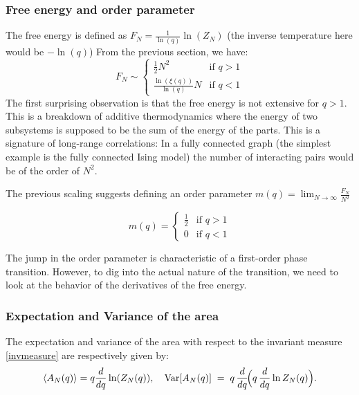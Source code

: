 \documentclass[pdflatex,sn-mathphys-num]{sn-jnl}
\theoremstyle{definition}
\theoremstyle{remark}
\numberwithin{equation}{section}
\begin{document}
\subsubsection{Free energy and order parameter}
The free energy is defined as $F_N = \frac{1}{\ln(q)} \ln(Z_N)$ (the inverse temperature here would be $-\ln(q)$)
From the previous section, we have:
\begin{equation}
    F_N \sim 
        \begin{cases}
      \frac{1}{2} N^2 & \text{if } q > 1\\
       \frac{ \ln(\xi(q))}{\ln(q)} N & \text{if } q < 1
    \end{cases}
\end{equation}
The first surprising observation is that the free energy is not extensive for $q>1$. This is a breakdown of additive thermodynamics where the energy of two subsystems is supposed to be the sum of the energy of the parts. This is a signature of long-range correlations: In a fully connected graph (the simplest example is the fully connected Ising model) the number of interacting pairs would be of the order of $N^2$.

The previous scaling suggests defining
an order parameter $ m(q) = \lim_{N \rightarrow \infty}
    \frac{F_N}{N^2}$


\begin{equation}
m(q) =
        \begin{cases}
       \frac{1}{2}  & \text{if } q > 1\\
        0 & \text{if } q < 1
    \end{cases}
\end{equation}

The jump in the order parameter is characteristic of a first-order phase transition. However, to dig into the actual nature of the transition, we need to look at the behavior of the derivatives of the free energy.
\subsubsection{Expectation and Variance of the area}
The expectation and variance of the area with respect to the invariant measure \ref{invmeasure} are respectively given by:
\begin{equation}
\langle A_N(q) \rangle  = q \frac{d}{dq} \ln(Z_N(q)), \quad
\operatorname{Var}[A_N(q)]
   \;=\;
   q\,\frac{d}{dq}\!\Bigl(q\,\frac{d}{dq}\ln Z_{N}(q)\Bigr).
\end{equation}
\end{document}
